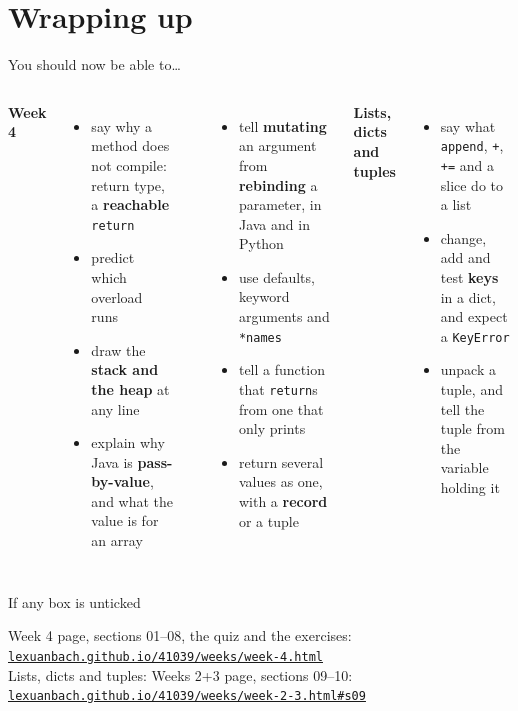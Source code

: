 \documentclass[aspectratio=169]{beamer}
\newcommand{\code}[1]{\texttt{#1}}
\newcommand{\srclink}[2]{\href{#1}{\texttt{#2}}}
\newcommand{\neutrallabel}[1]{\textcolor{bkblue}{\textbf{#1}}}
\newcommand{\yes}{\textcolor{goodgreen}{\ding{51}}}
\begin{document}
\section{Wrapping up}

\begin{frame}{You should now be able to\ldots}
  \begin{columns}[T,onlytextwidth]
    \neutrallabel{Week 4}
    \begin{itemize}[itemsep=0.1em]
      \footnotesize
      \item[\yes] say why a method does not compile: return type, a \textbf{reachable}
        \code{return}
      \item[\yes] predict which overload runs
      \item[\yes] draw the \textbf{stack and the heap} at any line
      \item[\yes] explain why Java is \textbf{pass-by-value}, and what the value is for an
        array
    \end{itemize}
    \neutrallabel{\phantom{Week 4}}
    \begin{itemize}[itemsep=0.1em]
      \footnotesize
      \item[\yes] tell \textbf{mutating} an argument from \textbf{rebinding} a parameter,
        in Java and in Python
      \item[\yes] use defaults, keyword arguments and \code{*names}
      \item[\yes] tell a function that \code{return}s from one that only prints
      \item[\yes] return several values as one, with a \textbf{record} or a tuple
    \end{itemize}
    \neutrallabel{Lists, dicts and tuples}
    \begin{itemize}[itemsep=0.1em]
      \footnotesize
      \item[\yes] say what \code{append}, \code{+}, \code{+=} and a slice do to a list
      \item[\yes] change, add and test \textbf{keys} in a dict, and expect a
        \code{KeyError}
      \item[\yes] unpack a tuple, and tell the tuple from the variable holding it
    \end{itemize}
  \end{columns}
  \vspace{0.1em}
  \begin{contextbox}{If any box is unticked}
    \footnotesize\raggedright Week 4 page, sections 01--08, the quiz and the exercises:
    \srclink{https://lexuanbach.github.io/41039/weeks/week-4.html}{lexuanbach.github.io/41039/weeks/week-4.html}\\
    Lists, dicts and tuples: Weeks 2+3 page, sections 09--10:
    \srclink{https://lexuanbach.github.io/41039/weeks/week-2-3.html\#s09}{lexuanbach.github.io/41039/weeks/week-2-3.html\#s09}
  \end{contextbox}
\end{frame}
\end{document}

